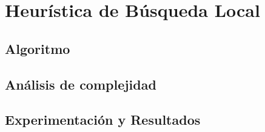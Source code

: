 \section{Heurística de Búsqueda Local}

\subsection{Algoritmo}

\subsection{Análisis de complejidad}

\subsection{Experimentación y Resultados}

